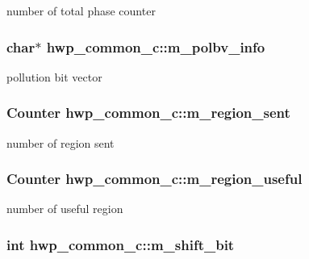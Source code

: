 \label{classhwp__common__c_a6e07cfc36d0a0f955a347608acf7681c}
number of total phase counter \hypertarget{classhwp__common__c_a391080d4f8aa02cba02bd177b0538ab3}{
\subsubsection[{m\_\-polbv\_\-info}]{\setlength{\rightskip}{0pt plus 5cm}char$\ast$ {\bf hwp\_\-common\_\-c::m\_\-polbv\_\-info}}}
\label{classhwp__common__c_a391080d4f8aa02cba02bd177b0538ab3}
pollution bit vector \hypertarget{classhwp__common__c_aadcc7e3de1eb3714564ab09503891baf}{
\subsubsection[{m\_\-region\_\-sent}]{\setlength{\rightskip}{0pt plus 5cm}Counter {\bf hwp\_\-common\_\-c::m\_\-region\_\-sent}}}
\label{classhwp__common__c_aadcc7e3de1eb3714564ab09503891baf}
number of region sent \hypertarget{classhwp__common__c_ab2549a1bf12d013b25728e3424120bf3}{
\subsubsection[{m\_\-region\_\-useful}]{\setlength{\rightskip}{0pt plus 5cm}Counter {\bf hwp\_\-common\_\-c::m\_\-region\_\-useful}}}
\label{classhwp__common__c_ab2549a1bf12d013b25728e3424120bf3}
number of useful region \hypertarget{classhwp__common__c_ad38f322721c4ef2c6d2780966c726b03}{
\subsubsection[{m\_\-shift\_\-bit}]{\setlength{\rightskip}{0pt plus 5cm}int {\bf hwp\_\-common\_\-c::m\_\-shift\_\-bit}}}
